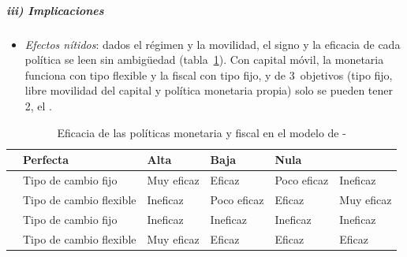 \documentclass[11pt]{article}
\begin{document}
\subparagraph{iii) Implicaciones}

\begin{itemize}
\item \emph{Efectos nítidos}: dados el régimen y la movilidad, el signo y la eficacia de cada política se leen sin ambigüedad (tabla~\ref{tab:mundell-fleming}). Con capital móvil, la monetaria funciona con tipo flexible y la fiscal con tipo fijo, y de 3~objetivos (tipo fijo, libre movilidad del capital y política monetaria propia) solo se pueden tener 2, el  .
\end{itemize}

\begin{table}[H]
\centering
\caption{Eficacia de las políticas monetaria y fiscal en el modelo de -}\label{tab:mundell-fleming}
\small
\begin{tabular}{>{\raggedright\arraybackslash}m{1.9cm}>{\raggedright\arraybackslash}m{3.0cm}>{\centering\arraybackslash}m{2.1cm}>{\centering\arraybackslash}m{2.1cm}>{\centering\arraybackslash}m{2.1cm}>{\centering\arraybackslash}m{2.1cm}}
\toprule
\rowcolor{tceeazulpalido} \multicolumn{2}{l}{Movilidad del capital} & Perfecta & Alta & Baja & Nula\\
\midrule
\multirow{2}{=}{Fiscal} & Tipo de cambio fijo & \textcolor{tceeverde}{Muy eficaz} & \textcolor{tceeverde}{Eficaz} & \textcolor{tceedorado}{Poco eficaz} & \textcolor{tceerojo}{Ineficaz}\\
 & Tipo de cambio flexible & \textcolor{tceerojo}{Ineficaz} & \textcolor{tceedorado}{Poco eficaz} & \textcolor{tceeverde}{Eficaz} & \textcolor{tceeverde}{Muy eficaz}\\
\midrule
\multirow{2}{=}{Monetaria} & Tipo de cambio fijo & \textcolor{tceerojo}{Ineficaz} & \textcolor{tceerojo}{Ineficaz} & \textcolor{tceerojo}{Ineficaz} & \textcolor{tceerojo}{Ineficaz}\\
 & Tipo de cambio flexible & \textcolor{tceeverde}{Muy eficaz} & \textcolor{tceeverde}{Eficaz} & \textcolor{tceeverde}{Eficaz} & \textcolor{tceeverde}{Eficaz}\\
\bottomrule
\end{tabular}
\end{table}
\end{document}

